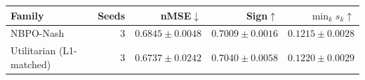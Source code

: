 \begin{tabular}{lrrrr}
\toprule
Family & Seeds & nMSE$\downarrow$ & Sign$\uparrow$ & $\min_k s_k\uparrow$\\
\midrule
NBPO-Nash & $3$ & $0.6845\pm0.0048$ & $0.7009\pm0.0016$ & $0.1215\pm0.0028$\\
Utilitarian (L1-matched) & $3$ & $0.6737\pm0.0242$ & $0.7040\pm0.0058$ & $0.1220\pm0.0029$\\
\bottomrule
\end{tabular}
